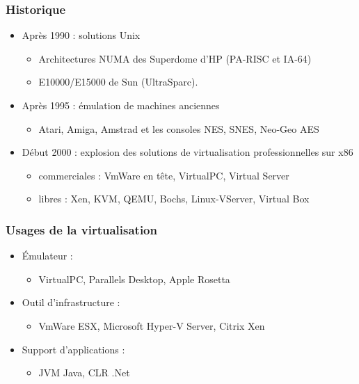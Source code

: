 \begin{frame}
\frametitle{Historique}
\begin{itemize}
\item <1>Après 1990 : solutions Unix
\begin{itemize}
\item Architectures NUMA des Superdome d'HP (PA-RISC et IA-64)
\item E10000/E15000 de Sun (UltraSparc).
\end{itemize}

\item <2>Après 1995 : émulation de machines anciennes
\begin{itemize}
\item Atari, Amiga, Amstrad et les consoles NES, SNES, Neo-Geo AES
\end{itemize}

\item <3>Début 2000 : explosion des solutions de virtualisation professionnelles sur x86
\begin{itemize}
\item commerciales : VmWare en tête, VirtualPC, Virtual Server 
\item libres : Xen, KVM, QEMU, Bochs, Linux-VServer, Virtual Box
\end{itemize}
\end{itemize}

\end{frame}


\begin{frame}
\frametitle{Usages de la virtualisation}
\begin{itemize}

\item <1>Émulateur :
\begin{itemize}
\item VirtualPC, Parallels Desktop, Apple Rosetta
\end{itemize}

\item <2>Outil d'infrastructure :
\begin{itemize}
\item VmWare ESX, Microsoft Hyper-V Server, Citrix Xen
\end{itemize}

\item <3>Support d'applications :
\begin{itemize}
\item JVM Java, CLR .Net
\end{itemize}

\end{itemize}
\end{frame}


